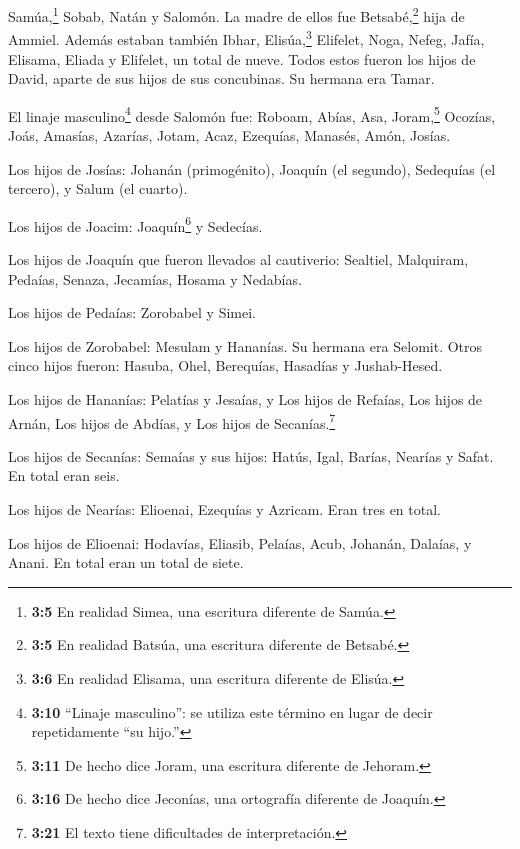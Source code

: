 Samúa,\footnote{\textbf{3:5} En realidad Simea, una escritura diferente
  de Samúa.} Sobab, Natán y Salomón. La madre de ellos fue
Betsabé,\footnote{\textbf{3:5} En realidad Batsúa, una escritura
  diferente de Betsabé.} hija de Ammiel.  Además estaban
también Ibhar, Elisúa,\footnote{\textbf{3:6} En realidad Elisama, una
  escritura diferente de Elisúa.} Elifelet,  Noga, Nefeg,
Jafía,  Elisama, Eliada y Elifelet, un total de nueve.
 Todos estos fueron los hijos de David, aparte de sus hijos
de sus concubinas. Su hermana era Tamar.

 El linaje masculino\footnote{\textbf{3:10} ``Linaje
  masculino'': se utiliza este término en lugar de decir repetidamente
  ``su hijo.''} desde Salomón fue: Roboam, Abías, Asa, 
Joram,\footnote{\textbf{3:11} De hecho dice Joram, una escritura
  diferente de Jehoram.} Ocozías, Joás,  Amasías, Azarías,
Jotam,  Acaz, Ezequías, Manasés,  Amón,
Josías.

 Los hijos de Josías: Johanán (primogénito), Joaquín (el
segundo), Sedequías (el tercero), y Salum (el cuarto).

 Los hijos de Joacim: Joaquín\footnote{\textbf{3:16} De
  hecho dice Jeconías, una ortografía diferente de Joaquín.} y Sedecías.

 Los hijos de Joaquín que fueron llevados al cautiverio:
Sealtiel,  Malquiram, Pedaías, Senaza, Jecamías, Hosama y
Nedabías.

 Los hijos de Pedaías: Zorobabel y Simei.

Los hijos de Zorobabel: Mesulam y Hananías. Su hermana era Selomit.
 Otros cinco hijos fueron: Hasuba, Ohel, Berequías,
Hasadías y Jushab-Hesed.

 Los hijos de Hananías: Pelatías y Jesaías, y Los hijos de
Refaías, Los hijos de Arnán, Los hijos de Abdías, y Los hijos de
Secanías.\footnote{\textbf{3:21} El texto tiene dificultades de
  interpretación.}

 Los hijos de Secanías: Semaías y sus hijos: Hatús, Igal,
Barías, Nearías y Safat. En total eran seis.

 Los hijos de Nearías: Elioenai, Ezequías y Azricam. Eran
tres en total.

 Los hijos de Elioenai: Hodavías, Eliasib, Pelaías, Acub,
Johanán, Dalaías, y Anani. En total eran un total de siete.

